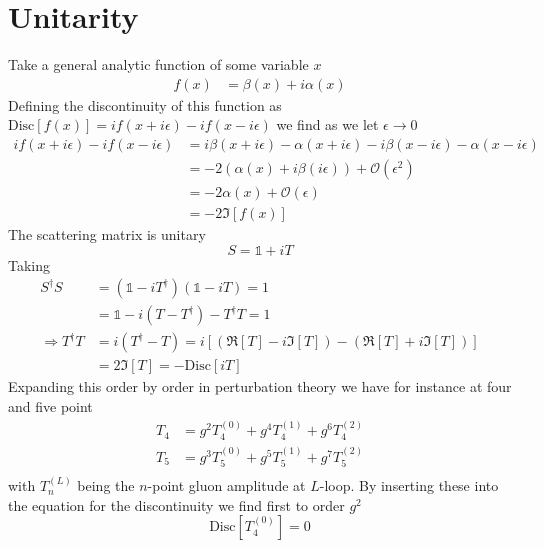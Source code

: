 \documentclass[a4paper,12pt]{article}
\begin{document}
\section{Unitarity}
Take a general analytic function of some variable $x$
\begin{equation}
\begin{aligned}
f(x)&=\beta(x)+i\alpha (x)
\end{aligned}
\end{equation}
Defining the discontinuity of this function as $\text{Disc}[f(x)]=if(x+i\epsilon)-if(x-i\epsilon)$ we find as we let $\epsilon\to 0$
\begin{equation}
\begin{aligned}
if(x+i\epsilon)-if(x-i\epsilon)&=i\beta(x+i\epsilon)-\alpha(x+i\epsilon)-i\beta(x-i\epsilon)-\alpha(x-i\epsilon)\\
&=-2\left(\alpha(x)+i\beta(i\epsilon)\right)+\mathcal{O}(\epsilon^2)\\
&=-2\alpha(x)+\mathcal{O}(\epsilon)\\
&=-2\Im[f(x)]
\end{aligned}
\end{equation}
The scattering matrix is unitary
\begin{equation}
S=\mathds{1}+iT
\end{equation}
Taking
\begin{equation}
\begin{aligned}
S^\dagger S&=(\mathds{1}-iT^\dagger)(\mathds{1}-iT)=1\\ &=\mathds{1}-i(T-T^\dagger)-T^\dagger T=1\\
\Rightarrow T^\dagger T&=i(T^\dagger -T)=i\left[(\Re[T]-i\Im[T])-(\Re[T]+i\Im[T])\right]\\
&=2\Im[T]=-\text{Disc}[iT]
\end{aligned}
\end{equation}
Expanding this order by order in perturbation theory we have for instance at four and five point
\begin{equation}
\begin{aligned}
T_4&=g^2T_4^{(0)}+g^4T_4^{(1)}+g^6T_4^{(2)}\\
T_5&=g^3T_5^{(0)}+g^5T_5^{(1)}+g^7T_5^{(2)}\\
\end{aligned}
\end{equation}
with $T_n^{(L)}$ being the $n$-point gluon amplitude at $L$-loop. By inserting these into the equation for the discontinuity we find first to order $g^2$
\begin{equation}
\text{Disc}[T_4^{(0)}]=0
\end{equation}
\end{document}

